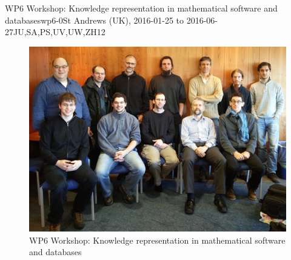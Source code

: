\begin{event}{WP6 Workshop: Knowledge representation in mathematical software and databases}{wp6-0}{St Andrews (UK), 2016-01-25 to 2016-06-27}{JU,SA,PS,UV,UW,ZH}{12}{}
\begin{figure}[ht]
  \caption*{WP6 Workshop: Knowledge representation in mathematical software and databases}
  \includegraphics[scale=0.5]{pictures/2016-01-25-DKS-group-picture.jpg}
  \end{figure}
\end{event}
